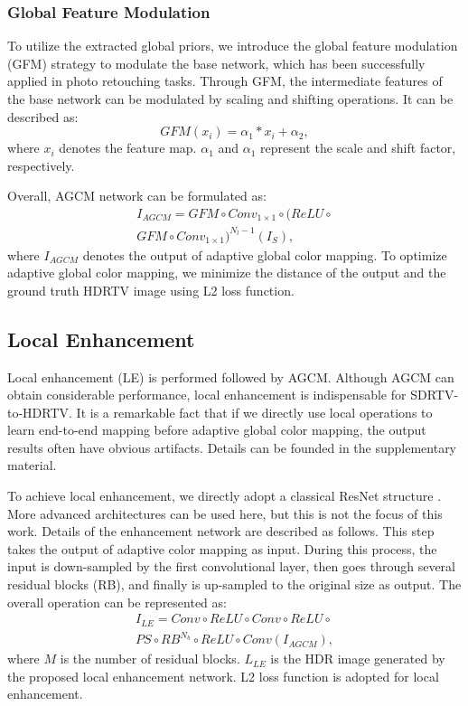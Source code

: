 \documentclass[10pt,twocolumn,letterpaper]{article}
\begin{document}
\subsubsection{Global Feature Modulation}
To utilize the extracted global priors, we introduce the global feature modulation (GFM) \cite{he2020conditional} strategy to modulate the base network, which has been successfully applied in photo retouching tasks. Through GFM, the intermediate features of the base network can be modulated by scaling and shifting operations. It can be described as:
\begin{equation}
   GFM(x_{i})=\alpha _{1}*x_{i}+\alpha _{2},
\end{equation}
where $x_{i}$ denotes the feature map. $\alpha _{1}$ and $\alpha _{1}$ represent the scale and shift factor, respectively.

Overall, AGCM network can be formulated as:
\begin{equation}
    \begin{split}
   I_{AGCM}=GFM\circ Conv_{1\times 1}\circ(ReLU\circ \\GFM \circ Conv_{1\times 1})^{N_l-1}(I_{S}),
   \end{split}
\end{equation}
where $I_{AGCM}$ denotes the output of adaptive global color mapping. To optimize adaptive global color mapping, we minimize the distance of the output and the ground truth HDRTV image using L2 loss function.

\subsection{Local Enhancement}
Local enhancement (LE) is performed followed by AGCM. Although AGCM can obtain considerable performance, local enhancement is indispensable for SDRTV-to-HDRTV. It is a remarkable fact that if we directly use local operations to learn end-to-end mapping before adaptive global color mapping, the output results often have obvious artifacts. Details can be founded in the supplementary material.

To achieve local enhancement, we directly adopt a classical ResNet structure \cite{he2016identity}. More advanced architectures can be used here, but this is not the focus of this work. Details of the enhancement network are described as follows. This step takes the output of adaptive color mapping as input. During this process, the input is down-sampled by the first convolutional layer, then goes through several residual blocks (RB), and finally is up-sampled to the original size as output. The overall operation can be represented as:
\begin{equation}
    \begin{split}
   I_{LE}=Conv\circ ReLU\circ Conv\circ ReLU\circ \\PS\circ RB^{N_b}\circ ReLU\circ Conv(I_{AGCM}),
    \end{split}
\end{equation}
where $M$ is the number of residual blocks. $L_{LE}$ is the HDR image generated by the proposed local enhancement network. L2 loss function is adopted for local enhancement.
\end{document}
